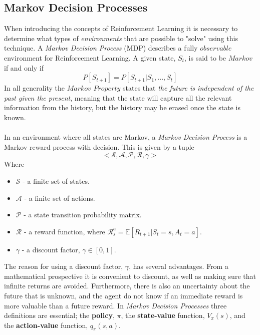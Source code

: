 \subsection{Markov Decision Processes}
When introducing the concepts of Reinforcement Learning it is necessary to determine what types of \textit{environments} that are possible to "solve" using this technique. A \textit{Markov Decision Process} (MDP) describes a fully $observable$ environment for Reinforcement Learning. A given state, $S_{t}$, is said to be $Markov$ if and only if
\begin{equation}
    P[S_{t+1}] = P[S_{t+1} | S_{1},...,S_{t}]
\end{equation}
In all generality the $\textit{Markov Property}$ states that \textit{the future is independent of the past given the present}, meaning that the state will capture all the relevant information from the history, but the history may be erased once the state is known.\\\\
In an environment where all states are Markov, a \textit{Markov Decision Process} is a Markov reward process with decision. This is given by a tuple $$<\mathcal{S, A, P, R, \gamma}>$$Where
\begin{itemize}
    \item $\mathcal{S}$ - a finite set of states.
    \item $\mathcal{A}$ - a finite set of actions.
    \item $\mathcal{P}$ - a state transition probability matrix.
    \item $\mathcal{R}$ - a reward function, where $\mathcal{R}^{a}_{s} = \mathbb{E}[R_{t+1}|S_{t}=s, A_{t} = a]$.
    \item $\mathcal{\gamma}$ - a discount factor, $\gamma \in [0, 1]$.
\end{itemize}
The reason for using a discount factor, $\mathcal{\gamma}$, has several advantages. From a mathematical prospective it is convenient to discount, as well as making sure that infinite returns are avoided. Furthermore, there is also an uncertainty about the future that is unknown, and the agent do not know if an immediate reward is more valuable than a future reward. In \textit{Markov Decision Processes} three definitions are essential; the \textbf{policy}, $\pi$, the \textbf{state-value} function, $V_{\pi}(s)$, and the \textbf{action-value} function, $q_{\pi}(s,a)$. 
